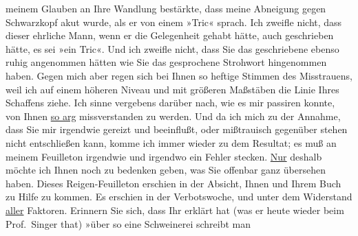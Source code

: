 \begin{ledgroupsized}[t]{13cm}
               meinem Glauben an Ihre Wandlung bestärkte, dass meine Abneigung gegen Schwarzkopf akut wurde, als er von einem »Tric«
               sprach. Ich zweifle nicht, dass dieser ehrliche Mann, wenn er die Gelegenheit gehabt
               hätte, auch geschrieben hätte, es sei »ein Tric«. Und ich zweifle nicht, dass Sie das
               geschriebene ebenso ruhig angenommen hätten wie Sie das gesprochene Strohwort
               hingenommen haben. Gegen mich aber regen sich bei Ihnen so heftige Stimmen des
               Misstrauens, weil ich auf einem höheren Niveau und mit größeren Maßstäben \strikeout{\textcolor{gray}{×}\-\textcolor{gray}{×}\-\textcolor{gray}{×}\-\textcolor{gray}{×}\-\textcolor{gray}{×}\-\textcolor{gray}{×}\-\textcolor{gray}{×}\-\textcolor{gray}{×}\-\textcolor{gray}{×}\-\textcolor{gray}{×}\-\textcolor{gray}{×}\-\textcolor{gray}{×}\-\textcolor{gray}{×}\-\textcolor{gray}{×}\-\textcolor{gray}{×}\-\textcolor{gray}{×}\-\textcolor{gray}{×}\-\textcolor{gray}{×}\-\textcolor{gray}{×}\-\textcolor{gray}{×},} die Linie Ihres
               Schaffens ziehe. \pend
           \pstart
           Ich sinne vergebens darüber nach, wie es mir passiren konnte, von Ihnen \uline{so arg} missverstanden zu werden. Und da ich mich zu
               der Annahme, dass Sie mir irgendwie gereizt und beeinflußt, oder mißtrauisch
               gegenüber stehen nicht entschließen kann, komme ich immer wieder zu dem Resultat; es
               muß an meinem Feuilleton
               irgendwie und irgendwo {\pb}ein
               Fehler stecken. \pend
           \pstart
           \uline{Nur} deshalb möchte ich Ihnen noch zu bedenken geben,
               was Sie offenbar ganz übersehen haben. Dieses Reigen-Feuilleton erschien in der Absicht, Ihnen und Ihrem
               Buch zu Hilfe zu kommen. Es erschien in der Verbotswoche, und unter dem Widerstand
                  \uline{aller} Faktoren. Erinnern Sie sich, dass Ihr
                  \label{K_L03353-123v}\label{K_L03353-1234h} erklärt hat (was er heute wieder beim Prof. Singer that) »über so eine Schweinerei schreibt man

\end{ledgroupsized}
